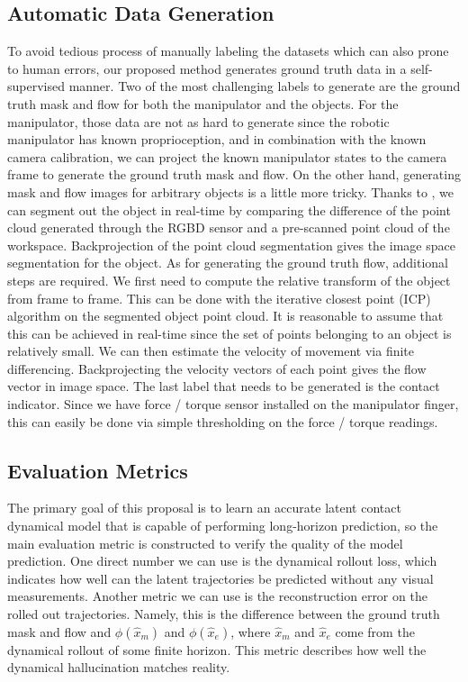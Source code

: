 \documentclass[conference]{IEEEtran}
\begin{document}
\subsection{Automatic Data Generation}\label{sec:data_gen}
To avoid tedious process of manually labeling the datasets which can also prone to
human errors, our proposed method
generates ground truth data in a self-supervised manner. Two of the most challenging labels
to generate are the ground truth mask and flow for both the manipulator and the
objects. For the manipulator, those data are not as hard to generate since the
robotic manipulator has known proprioception, and in combination with the
known camera calibration, we can project the known manipulator states to the camera
frame to generate the ground truth mask and flow. On the other hand, generating
mask and flow images for arbitrary objects is a little more tricky. Thanks to \cite{3d_detection},
we can segment out the object in real-time by comparing the difference of the
point cloud generated through the RGBD sensor and a pre-scanned point cloud
of the workspace. Backprojection of the point cloud segmentation gives the
image space segmentation for the object. As for generating the ground truth
flow, additional steps are required. We first need to compute the relative
transform of the object from frame to frame. This can be done with the iterative
closest point (ICP) algorithm on the segmented object point cloud. It is reasonable
to assume that this can be achieved in real-time since the set of points belonging
to an object is relatively small. We can then estimate the velocity of movement
via finite differencing. Backprojecting the velocity vectors of each point
gives the flow vector in image space. The last label that needs to be generated
is the contact indicator. Since we have force / torque sensor installed on the
manipulator finger, this can easily be done via simple thresholding on the
force / torque readings.

\subsection{Evaluation Metrics}
The primary goal of this proposal is to learn an accurate latent contact dynamical
model that is capable of performing long-horizon prediction, so the main evaluation
metric is constructed to verify the quality of the model prediction.
One direct number we can use is the dynamical rollout loss, which indicates how
well can the latent trajectories be predicted without any visual measurements.
Another metric we can use is the reconstruction error on the rolled out trajectories.
Namely, this is the difference between the ground truth mask and flow and
$\phi(\hat{x}_m)$ and $\phi(\hat{x}_e)$, where $\hat{x}_m$ and $\hat{x}_e$ come
from the dynamical rollout of some finite horizon. This metric describes how
well the dynamical hallucination matches reality.
\end{document}
